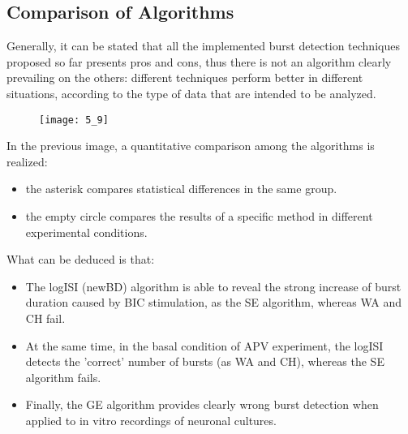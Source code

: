 \subsection{Comparison of Algorithms}
Generally, it can be stated that all the implemented burst detection techniques proposed so far presents pros and cons, thus there is not an algorithm clearly prevailing on the others: different techniques perform better in different situations, according to the type of data that are intended to be analyzed.
\begin{figure}[H]
    \texttt{[image: 5\_9]}
    \centering
\end{figure}
In the previous image, a quantitative comparison among the algorithms is realized:
\begin{itemize}
    \item the asterisk compares statistical differences in the same group.
    \item the empty circle compares the results of a specific method in different experimental conditions.
\end{itemize}
What can be deduced is that:
\begin{itemize}
    \item The logISI (newBD) algorithm is able to reveal the strong increase of burst duration caused by BIC stimulation, as the SE algorithm, whereas WA and CH fail.
    \item At the same time, in the basal condition of APV experiment, the logISI detects the 'correct' number of bursts (as WA and CH), whereas the SE algorithm fails.
    \item Finally, the GE algorithm provides clearly wrong burst detection when applied to in vitro recordings of neuronal cultures.
\end{itemize}